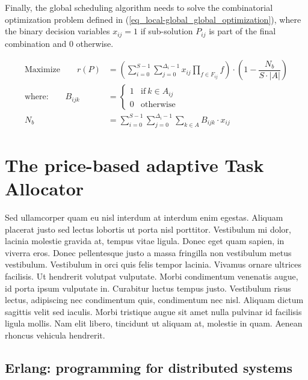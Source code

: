 Finally, the global scheduling algorithm needs to solve the combinatorial optimization problem defined in (\ref{eq_local-global_global_optimization}), where the binary decision variables $x_{ij}=1$ if sub-solution $P_{ij}$ is part of the final combination and 0 otherwise.

\begin{subequations}
\label{eq_local-global_global_optimization}
\begin{align}
\text{Maximize} \qquad r(P) &= \left(\sum_{i=0}^{S-1}\sum_{j=0}^{\Delta_i-1}x_{ij}{\prod_{f \in F_{ij}}f}\right)\cdot\left(1-\dfrac{N_b}{S\cdot |A|}\right)\\
\text{where:} \qquad B_{ijk} &= \begin{cases}1 & \text{if} ~k \in A_{ij}\\ 0 & \text{otherwise}\end{cases}\\
N_b &= \sum_{i=0}^{S-1}\sum_{j=0}^{\Delta_i-1}\sum_{k \in A}{B_{ijk}\cdot x_{ij}}
\end{align}
\end{subequations}


\section{The price-based adaptive Task Allocator}
\label{MBimplementation}
Sed ullamcorper quam eu nisl interdum at interdum enim egestas. Aliquam placerat justo sed lectus lobortis ut porta nisl porttitor. Vestibulum mi dolor, lacinia molestie gravida at, tempus vitae ligula. Donec eget quam sapien, in viverra eros. Donec pellentesque justo a massa fringilla non vestibulum metus vestibulum. Vestibulum in orci quis felis tempor lacinia. Vivamus ornare ultrices facilisis. Ut hendrerit volutpat vulputate. Morbi condimentum venenatis augue, id porta ipsum vulputate in. Curabitur luctus tempus justo. Vestibulum risus lectus, adipiscing nec condimentum quis, condimentum nec nisl. Aliquam dictum sagittis velit sed iaculis. Morbi tristique augue sit amet nulla pulvinar id facilisis ligula mollis. Nam elit libero, tincidunt ut aliquam at, molestie in quam. Aenean rhoncus vehicula hendrerit.

\subsection{Erlang: programming for distributed systems}

